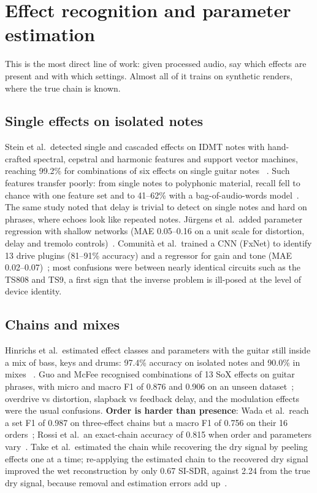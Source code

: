 \section{Effect recognition and parameter estimation}
\label{sec:recognition}

This is the most direct line of work: given processed audio, say which effects
are present and with which settings. Almost all of it trains on synthetic
renders, where the true chain is known.

\subsection{Single effects on isolated notes}

Stein et al.\ detected single and cascaded effects on IDMT notes with
hand-crafted spectral, cepstral and harmonic features and support vector
machines, reaching 99.2\% for combinations of six effects on single guitar notes
\reported~\cite{stein2010aes,stein2010dafx}. Such features transfer poorly:
from single notes to polyphonic material, recall fell to chance with one feature
set and to 41--62\% with a bag-of-audio-words model~\cite{schmitt2017recognising}.
The same study noted that delay is trivial to detect on single notes and hard on
phrases, where echoes look like repeated notes. Jürgens et al.\ added parameter
regression with shallow networks (MAE 0.05--0.16 on a unit scale for distortion,
delay and tremolo controls)~\cite{jurgens2020recognizing}. Comunità et al.\
trained a CNN (FxNet) to identify 13 drive plugins (81--91\% accuracy) and a
regressor for gain and tone (MAE 0.02--0.07)~\cite{comunita2021guitar}; most
confusions were between nearly identical circuits such as the TS808 and TS9, a
first sign that the inverse problem is ill-posed at the level of device
identity.

\subsection{Chains and mixes}

Hinrichs et al.\ estimated effect classes and parameters with the guitar still
inside a mix of bass, keys and drums: 97.4\% accuracy on isolated notes and
90.0\% in mixes \reported~\cite{hinrichs2022convolutional}. Guo and McFee
recognised combinations of 13 SoX effects on guitar phrases, with micro and macro
F1 of 0.876 and 0.906 on an unseen dataset~\cite{guo2023automatic}; overdrive vs
distortion, slapback vs feedback delay, and the modulation effects were the usual
confusions. \textbf{Order is harder than presence}: Wada et al.\ reach a set F1
of 0.987 on three-effect chains but a macro F1 of 0.756 on their 16
orders~\cite{wada2025hyperbolic}; Rossi et al.\ an exact-chain accuracy of 0.815
when order and parameters vary~\cite{rossi2025automatic}. Take et al.\ estimated
the chain while recovering the dry signal by peeling effects one at a time;
re-applying the estimated chain to the recovered dry signal improved the wet
reconstruction by only 0.67\dB{} SI-SDR, against 2.24\dB{} from the true dry
signal, because removal and estimation errors add up~\cite{take2024audio}.

